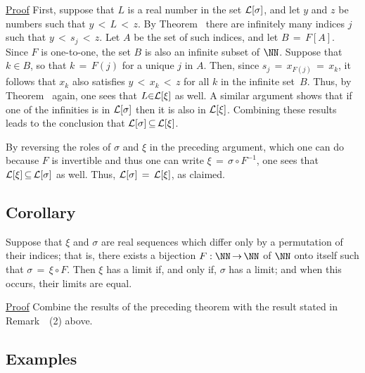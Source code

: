 {\V

        \underline{Proof} First, suppose that $L$ is a real number in the set ${\cal L}[{\sigma}]$,
    and let $y$ and $z$ be numbers such that $y\,<\,L\,<\,z$. By Theorem~ there are infinitely many indices $j$ such that $y\,<\,s_{j}\,<\,z$.
    Let $A$ be the set of such indices, and let $B \,=\, F[A]$. Since $F$ is one-to-one, the set $B$ is also an infinite subset of ${\NN}$.
    Suppose that $k{\in}B$, so that $k \,=\, F(j)$ for a unique $j$ in $A$.
    Then, since $s_{j} \,=\, x_{F(j)} \,=\, x_{k}$, it follows that $x_{k}$ also satisfies $y\,<\,x_{k}\,<\,z$ for all $k$ in the infinite set~$B$.
    Thus, by Theorem~ again, one sees that $L{\in}{\cal L}[{\xi}]$ as well.
    A similar argument shows that if one of the infinities is in ${\cal L}[{\sigma}]$ then it is also in ${\cal L}[{\xi}]$.
    Combining these results leads to the conclusion that ${\cal L}[{\sigma}] \,{\subseteq}\, {\cal L}[{\xi}]$.

        By reversing the roles of ${\sigma}$ and ${\xi}$ in the preceding argument,
    which one can do because $F$ is invertible and thus one can write ${\xi} \,=\, {\sigma}{\circ}F^{-1}$,
    one sees that ${\cal L}[{\xi}] \,{\subseteq}\, {\cal L}[{\sigma}]$ as well.
    Thus, ${\cal L}[{\sigma}] \,=\, {\cal L}[{\xi}]$, as claimed.

\V
            \subsection{\small{\bf Corollary}}
            \label{CorC50.120}

        Suppose that ${\xi}$ and ${\sigma}$ are real sequences which differ only by a permutation of their indices;
    that is, there exists a bijection $F:{\NN} \,{\rightarrow}\, {\NN}$ of ${\NN}$ onto itself such that ${\sigma} \,=\, {\xi}{\circ}F$.
    Then ${\xi}$ has a limit if, and only if, ${\sigma}$ has a limit; and when this occurs, their limits are equal.

\V

        \underline{Proof} Combine the results of the preceding theorem with the result stated in Remark~~(2) above.

\V
\V


            \subsection{\small{\bf Examples}}
            \label{ExampC50.130}

}
